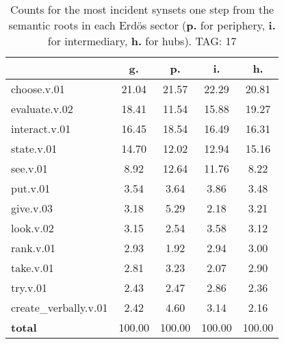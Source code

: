 \begin{table}[h!]
\begin{center}
\begin{tabular}{| l | c | c | c | c |}\hline
 & g. & p. & i. & h. \\\hline
choose.v.01 & 21.04  & 21.57  & 22.29  & 20.81 \\\hline
evaluate.v.02 & 18.41  & 11.54  & 15.88  & 19.27 \\\hline
interact.v.01 & 16.45  & 18.54  & 16.49  & 16.31 \\\hline
state.v.01 & 14.70  & 12.02  & 12.94  & 15.16 \\\hline
see.v.01 & 8.92  & 12.64  & 11.76  & 8.22 \\\hline
put.v.01 & 3.54  & 3.64  & 3.86  & 3.48 \\\hline
give.v.03 & 3.18  & 5.29  & 2.18  & 3.21 \\\hline
look.v.02 & 3.15  & 2.54  & 3.58  & 3.12 \\\hline
rank.v.01 & 2.93  & 1.92  & 2.94  & 3.00 \\\hline
take.v.01 & 2.81  & 3.23  & 2.07  & 2.90 \\\hline
try.v.01 & 2.43  & 2.47  & 2.86  & 2.36 \\\hline
create\_verbally.v.01 & 2.42  & 4.60  & 3.14  & 2.16 \\\hline
{{\bf total}} & 100.00  & 100.00  & 100.00  & 100.00 \\\hline
\end{tabular}
\caption{Counts for the most incident synsets one step from the semantic roots in each Erd\"os sector ({\bf p.} for periphery, {\bf i.} for intermediary, {\bf h.} for hubs). TAG: 17}
\end{center}
\end{table}